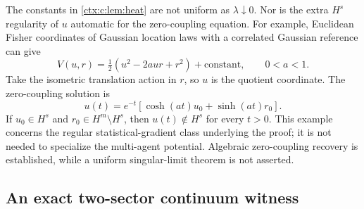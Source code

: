 The constants in \cref{ctx:c:lem:heat} are not uniform as $\lambda\downarrow0$. Nor is the extra $H^s$ regularity of $u$ automatic for the zero-coupling equation. For example, Euclidean Fisher coordinates of Gaussian location laws with a correlated Gaussian reference can give
\begin{equation}
 V(u,r)=\tfrac12(u^2-2aur+r^2)+\text{constant},\qquad 0<a<1.
\end{equation}
Take the isometric translation action in $r$, so $u$ is the quotient coordinate. The zero-coupling solution is
\begin{equation}
 u(t)=e^{-t}[\cosh(at)u_0+\sinh(at)r_0].
\end{equation}
If $u_0\in H^s$ and $r_0\in H^m\setminus H^s$, then $u(t)\notin H^s$ for every $t>0$. This example concerns the regular statistical-gradient class underlying the proof; it is not needed to specialize the multi-agent potential. Algebraic zero-coupling recovery is established, while a uniform singular-limit theorem is not asserted.

\subsection{An exact two-sector continuum witness}

